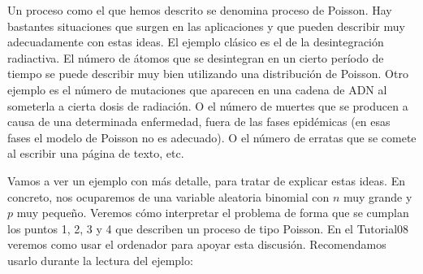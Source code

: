 Un proceso como el que hemos descrito se denomina {\sf proceso de Poisson}. Hay bastantes situaciones que surgen en las aplicaciones y
que pueden describir muy adecuadamente con estas ideas. El ejemplo clásico es el de la
desintegración radiactiva. El número de átomos que se desintegran en un cierto período de tiempo se
puede describir muy bien utilizando una distribución de Poisson. Otro ejemplo es el número de
mutaciones que aparecen en una cadena de ADN al someterla a cierta dosis de radiación. O el número
de muertes que se producen a causa de una determinada enfermedad, fuera de las fases epidémicas (en
esas fases el modelo de Poisson no es adecuado). O el número de erratas que se comete al escribir
una página de texto, etc.

Vamos a ver un ejemplo con más detalle, para tratar de explicar estas ideas. En concreto, nos ocuparemos de una variable aleatoria binomial con $n$ muy grande y $p$ muy pequeño. Veremos cómo interpretar el problema de forma que se cumplan los puntos 1, 2, 3 y 4 que describen un proceso de tipo Poisson. En el Tutorial08 veremos como usar el ordenador para apoyar esta discusión. Recomendamos usarlo durante la lectura del ejemplo:
